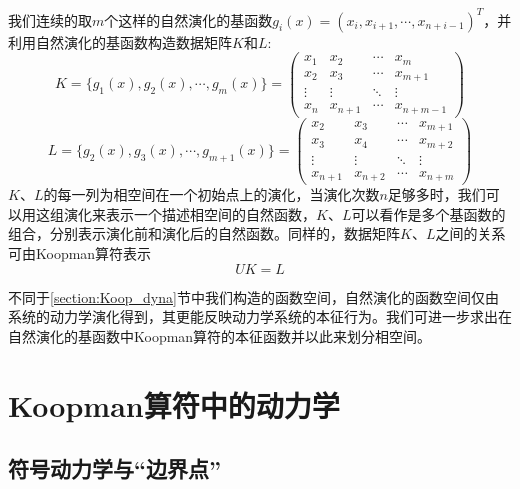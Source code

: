 我们连续的取$m$个这样的自然演化的基函数$g_i(x)=(x_i,x_{i+1},\cdots,x_{n+i-1})^T$，并利用自然演化的基函数构造数据矩阵$K$和$L$:
\begin{equation}
    K=\{g_1(x),g_2(x),\cdots,g_m(x)\}=
    \begin{pmatrix}
        x_1 & x_2 & \cdots & x_m \\
        x_2 & x_3 & \cdots & x_{m+1} \\
        \vdots         & \vdots         & \ddots & \vdots \\
        x_n & x_{n+1} & \cdots & x_{n+m-1}
    \end{pmatrix}
\end{equation}
\begin{equation}
    L=\{g_2(x),g_3(x),\cdots,g_{m+1}(x)\}=
    \begin{pmatrix}
        x_2 & x_3 & \cdots & x_{m+1} \\
        x_3 & x_4 & \cdots & x_{m+2} \\
        \vdots         & \vdots         & \ddots & \vdots \\
        x_{n+1} & x_{n+2} & \cdots & x_{n+m}
    \end{pmatrix}
\end{equation}
$K$、$L$的每一列为相空间在一个初始点上的演化，当演化次数$n$足够多时，我们可以用这组演化来表示一个描述相空间的自然函数，$K$、$L$可以看作是多个基函数的组合，分别表示演化前和演化后的自然函数。同样的，数据矩阵$K$、$L$之间的关系可由Koopman算符表示
\begin{equation}
    UK=L
    \label{eq:Koop_kl2}
\end{equation}

不同于\ref{section:Koop_dyna}节中我们构造的函数空间，自然演化的函数空间仅由系统的动力学演化得到，其更能反映动力学系统的本征行为。我们可进一步求出在自然演化的基函数中Koopman算符的本征函数并以此来划分相空间。

\section{Koopman算符中的动力学}

\subsection{符号动力学与“边界点”}


